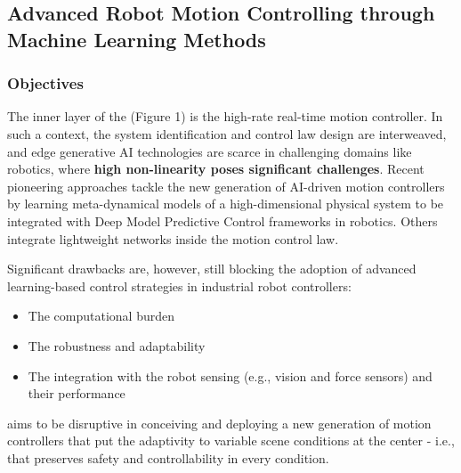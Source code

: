 \clearpage
\subsection{\texorpdfstring{Advanced Robot Motion Controlling through
Machine Learning Methods
}{Advanced Robot Motion Controlling through Machine Learning Methods }}\label{advanced-robot-motion-controlling-through-machine-learning-methods}

\subsubsection{\texorpdfstring{Objectives
}{Objectives }}\label{objectives-2}

The inner layer of the  (Figure 1) is the high-rate
real-time motion controller. In such a context, the system
identification and control law design are interweaved, and edge
generative AI technologies are scarce in challenging domains like
robotics, where \textbf{high non-linearity poses significant
challenges}. Recent pioneering approaches tackle the new generation of
AI-driven motion controllers by learning meta-dynamical models of a
high-dimensional physical system to be integrated with Deep Model
Predictive Control frameworks in robotics. Others integrate lightweight
networks inside the motion control law.

Significant drawbacks are, however, still blocking the adoption of
advanced learning-based control strategies in industrial robot
controllers:

\begin{itemize}
\item
  The computational burden
\item
  The robustness and adaptability
\item
  The integration with the robot sensing (e.g., vision and force
  sensors) and their performance
\end{itemize}

 aims to be disruptive in conceiving and deploying a
new generation of motion controllers that put the adaptivity to variable
scene conditions at the center - i.e., that preserves safety and
controllability in every condition.


